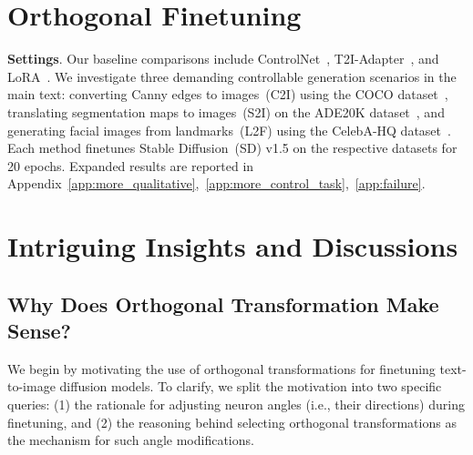 \begin{itemize}[leftmargin=*,nosep]
\section{Orthogonal Finetuning}

\textbf{Settings}. Our baseline comparisons include ControlNet~\cite{zhang2023adding}, T2I-Adapter~\cite{mou2023t2i}, and LoRA~\cite{hulora2022}. We investigate three demanding controllable generation scenarios in the main text: converting Canny edges to images~(C2I) using the COCO dataset~\cite{lin2014microsoft}, translating segmentation maps to images~(S2I) on the ADE20K dataset~\cite{zhou2017scene}, and generating facial images from landmarks~(L2F) using the CelebA-HQ dataset~\cite{karras2018progressive,xia2021tedigan}. Each method finetunes Stable Diffusion~(SD) v1.5 on the respective datasets for 20 epochs. Expanded results are reported in Appendix~\ref{app:more_qualitative},~\ref{app:more_control_task},~\ref{app:failure}.

\section{Intriguing Insights and Discussions}

\subsection{Why Does Orthogonal Transformation Make Sense?}

We begin by motivating the use of orthogonal transformations for finetuning text-to-image diffusion models. To clarify, we split the motivation into two specific queries: (1) the rationale for adjusting neuron angles (i.e., their directions) during finetuning, and (2) the reasoning behind selecting orthogonal transformations as the mechanism for such angle modifications.


\end{itemize}
